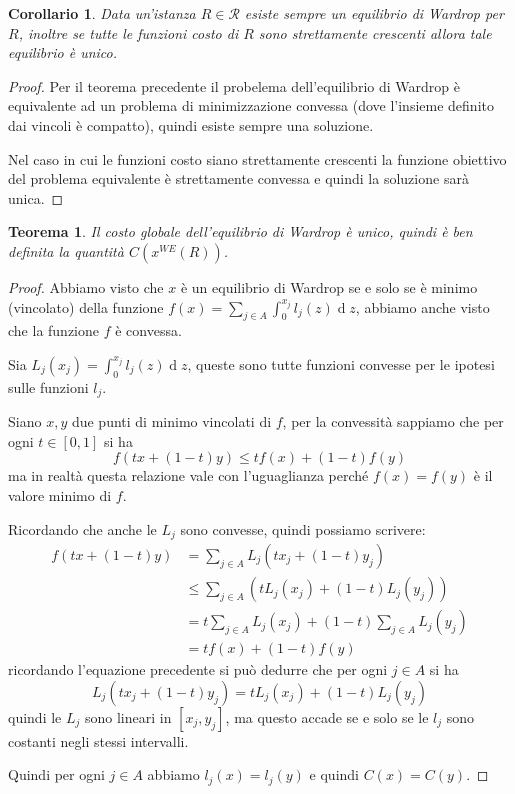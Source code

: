 \documentclass[a4paper]{article}
\newcounter{counter1}
\theoremstyle{plain}
\newtheorem{myteo}[counter1]{Teorema}
\newtheorem{mycor}[counter1]{Corollario}
\theoremstyle{definition}
\theoremstyle{remark}
\newcommand{\pa}[1]{\left(#1\right)}
\newcommand{\bra}[1]{\left[#1\right]}
\DeclareMathOperator{\de}{d}
\begin{document}
\begin{mycor}
  Data un'istanza $R\in \mathcal{R}$ esiste sempre un equilibrio di
  Wardrop per $R$, inoltre se tutte le funzioni costo di $R$ sono
  strettamente crescenti allora tale equilibrio è unico.
\end{mycor}
\begin{proof}
  Per il teorema precedente il probelema dell'equilibrio di Wardrop è
  equivalente ad un problema di minimizzazione convessa (dove
  l'insieme definito dai vincoli è compatto), quindi esiste sempre una
  soluzione.

  Nel caso in cui le funzioni costo siano strettamente crescenti la
  funzione obiettivo del problema equivalente è strettamente convessa
  e quindi la soluzione sarà unica.
\end{proof}

\begin{myteo}
  Il costo globale dell'equilibrio di Wardrop è unico, quindi è ben
  definita la quantità $C\pa{x^{WE}\pa{R}}$.
\end{myteo}
\begin{proof}
  Abbiamo visto che $x$ è un equilibrio di Wardrop se e solo se è
  minimo (vincolato) della funzione $f(x) = \sum _{j\in A} \int _0
  ^{x_j} l_j(z)\de z$, abbiamo anche visto che la funzione $f$ è
  convessa.

  Sia $L_j(x_j) = \int _0 ^{x_j} l_j(z)\de z$, queste sono tutte
  funzioni convesse per le ipotesi sulle funzioni $l_j$.

  Siano $x,y$ due punti di minimo vincolati di $f$, per la convessità
  sappiamo che per ogni $t\in\bra{0,1}$ si ha
  \[ f\pa{ tx + (1-t)y} \le tf(x) + (1-t)f(y) \]
  ma in realtà questa relazione vale con l'uguaglianza perché
  $f(x)=f(y)$ è il valore minimo di $f$.

  Ricordando che anche le $L_j$ sono convesse, quindi possiamo
  scrivere:
  \begin{align*}
    f\pa{ tx + (1-t)y} & = \sum _{j\in A} L_j\pa{tx_j + (1-t)y_j} \\
    & \le \sum _{j\in A} \pa{ tL_j(x_j) + (1-t)L_j(y_j)} \\
    & = t \sum _{j\in A} L_j(x_j) + (1-t)\sum _{j\in A} L_j(y_j) \\
    & = tf(x) + (1-t)f(y)
  \end{align*}
  ricordando l'equazione precedente si può dedurre che per ogni $j\in
  A$ si ha
  \[ L_j\pa{tx_j + (1-t)y_j} = tL_j(x_j) + (1-t)L_j(y_j) \]
  quindi le $L_j$ sono lineari in $\bra{x_j,y_j}$, ma questo accade se
  e solo se le $l_j$ sono costanti negli stessi intervalli.

  Quindi per ogni $j\in A$ abbiamo $l_j(x) = l_j(y)$ e quindi $C(x) = C(y)$.  
\end{proof}
\end{document}
